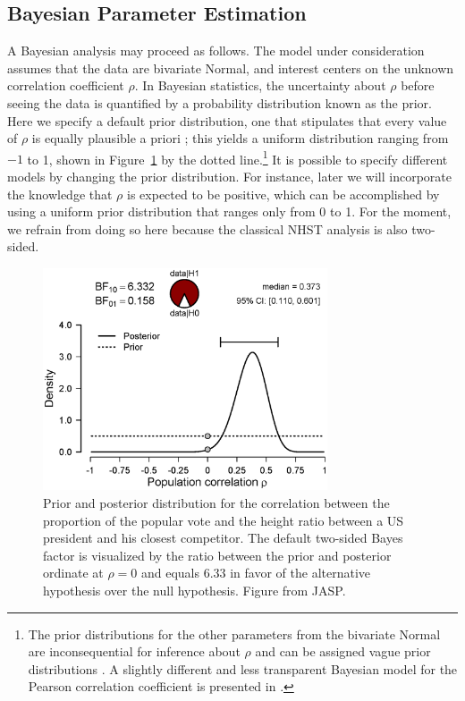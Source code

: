 \subsection{Bayesian Parameter Estimation}
A Bayesian analysis may proceed as follows. The model under consideration assumes that the data are bivariate Normal, and interest centers on the unknown correlation coefficient $\rho$. In Bayesian statistics, the uncertainty about $\rho$ before seeing the data is quantified by a probability distribution known as the prior. Here we specify a default prior distribution, one that stipulates that every value of $\rho$ is equally plausible a priori \cite{Jeffreys1961}; this yields a uniform distribution ranging from $-1$ to 1, shown in Figure~\ref{fig:bi1:PresidentsDens} by the dotted line.\footnote{The prior distributions for the other parameters from the bivariate Normal are inconsequential for inference about $\rho$ and can be assigned vague prior distributions \cite{LyEtAl2016}. A slightly different and less transparent Bayesian model for the Pearson correlation coefficient is presented in .} It is possible to specify different models by changing the prior distribution. For instance, later we will incorporate the knowledge that $\rho$ is expected to be positive, which can be accomplished by using a uniform prior distribution that ranges only from 0 to 1. For the moment, we refrain from doing so here because the classical NHST analysis is also two-sided.

\begin{figure}[tbh]
    \begin{center}
        \includegraphics[width=0.75\textwidth]{figs/bi1_PresidentsDens}
        \caption{Prior and posterior distribution for the correlation between the proportion of the popular vote and the height ratio between a US president and his closest competitor. The default two-sided Bayes factor is visualized by the ratio between the prior and posterior ordinate at $\rho = 0$ and equals $6.33$ in favor of the alternative hypothesis over the null hypothesis. Figure from JASP.}\label{fig:bi1:PresidentsDens}
    \end{center}
\end{figure}

